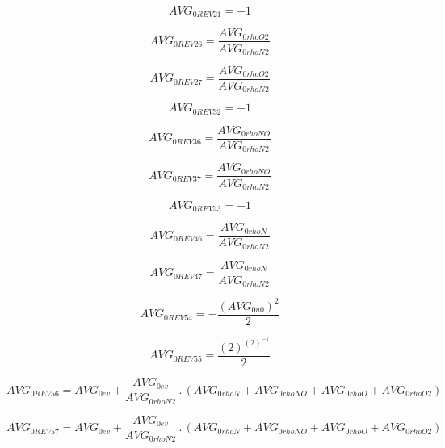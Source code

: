 \documentclass{article}
\begin{document}
\begin{dmath}AVG_{0 REV 21} = -1\end{dmath}

\begin{dmath}AVG_{0 REV 26} = \frac{AVG_{0 rhoO2}}{AVG_{0 rhoN2}}\end{dmath}

\begin{dmath}AVG_{0 REV 27} = \frac{AVG_{0 rhoO2}}{AVG_{0 rhoN2}}\end{dmath}

\begin{dmath}AVG_{0 REV 32} = -1\end{dmath}

\begin{dmath}AVG_{0 REV 36} = \frac{AVG_{0 rhoNO}}{AVG_{0 rhoN2}}\end{dmath}

\begin{dmath}AVG_{0 REV 37} = \frac{AVG_{0 rhoNO}}{AVG_{0 rhoN2}}\end{dmath}

\begin{dmath}AVG_{0 REV 43} = -1\end{dmath}

\begin{dmath}AVG_{0 REV 46} = \frac{AVG_{0 rhoN}}{AVG_{0 rhoN2}}\end{dmath}

\begin{dmath}AVG_{0 REV 47} = \frac{AVG_{0 rhoN}}{AVG_{0 rhoN2}}\end{dmath}

\begin{dmath}AVG_{0 REV 54} = - \frac{\left(AVG_{0 u0} \right)^{2}}{2}\end{dmath}

\begin{dmath}AVG_{0 REV 55} = \frac{\left(2 \right)^{\left(2 \right)^{-1}}}{2}\end{dmath}

\begin{dmath}AVG_{0 REV 56} = AVG_{0 ev} + \frac{AVG_{0 ev}}{AVG_{0 rhoN2}} \,.\, \left(AVG_{0 rhoN} + AVG_{0 rhoNO} + AVG_{0 rhoO} + AVG_{0 rhoO2}\right)\end{dmath}

\begin{dmath}AVG_{0 REV 57} = AVG_{0 ev} + \frac{AVG_{0 ev}}{AVG_{0 rhoN2}} \,.\, \left(AVG_{0 rhoN} + AVG_{0 rhoNO} + AVG_{0 rhoO} + AVG_{0 rhoO2}\right)\end{dmath}
\end{document}
